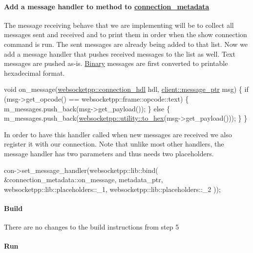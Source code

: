 \paragraph*{Add a message handler to method to {\ttfamily \mbox{\hyperlink{classconnection__metadata}{connection\+\_\+metadata}}}}

The message receiving behave that we are implementing will be to collect all messages sent and received and to print them in order when the show connection command is run. The sent messages are already being added to that list. Now we add a message handler that pushes received messages to the list as well. Text messages are pushed as-\/is. \mbox{\hyperlink{struct_binary}{Binary}} messages are first converted to printable hexadecimal format.


\begin{DoxyCode}
\textcolor{keywordtype}{void} on\_message(\mbox{\hyperlink{namespacewebsocketpp_a6b3d26a10ee7229b84b776786332631d}{websocketpp::connection\_hdl}} hdl, 
      \mbox{\hyperlink{classwebsocketpp_1_1endpoint_a585ecbbfd9689d4e4229e4c8378bd672}{client::message\_ptr}} msg) \{
    \textcolor{keywordflow}{if} (msg->get\_opcode() == websocketpp::frame::opcode::text) \{
        m\_messages.push\_back(msg->get\_payload());
    \} \textcolor{keywordflow}{else} \{
        m\_messages.push\_back(\mbox{\hyperlink{namespacewebsocketpp_1_1utility_a26e5a26395d95d2f6bf3a9edb8d06dd2}{websocketpp::utility::to\_hex}}(msg->get\_payload()));
    \}
\}
\end{DoxyCode}


In order to have this handler called when new messages are received we also register it with our connection. Note that unlike most other handlers, the message handler has two parameters and thus needs two placeholders.


\begin{DoxyCode}
con->set\_message\_handler(websocketpp::lib::bind(
    &connection\_metadata::on\_message,
    metadata\_ptr,
    websocketpp::lib::placeholders::\_1,
    websocketpp::lib::placeholders::\_2
));
\end{DoxyCode}


\paragraph*{Build}

There are no changes to the build instructions from step 5

\paragraph*{Run}

